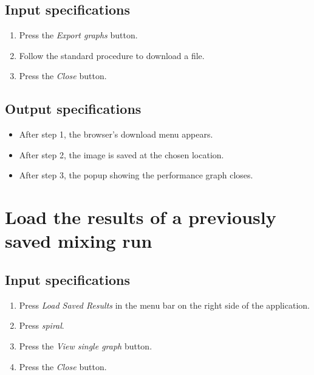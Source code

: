 \subsection*{Input specifications}
\begin{enumerate}
\item Press the \emph{Export graphs} button.
\item Follow the standard procedure to download a file.
\item Press the \emph{Close} button.
\end{enumerate}

\subsection*{Output specifications}
\begin{itemize}
\item After step 1, the browser's download menu appears.
\item After step 2, the image is saved at the chosen location.
\item After step 3, the popup showing the performance graph closes.
\end{itemize}
 
\section{Load the results of a previously saved mixing run}

\subsection*{Input specifications}
\begin{enumerate}
\item Press \emph{Load Saved Results} in the menu bar on the right side of the application.
\item Press \emph{spiral}.
\item Press the \emph{View single graph} button.
\item Press the \emph{Close} button.
\end{enumerate}

